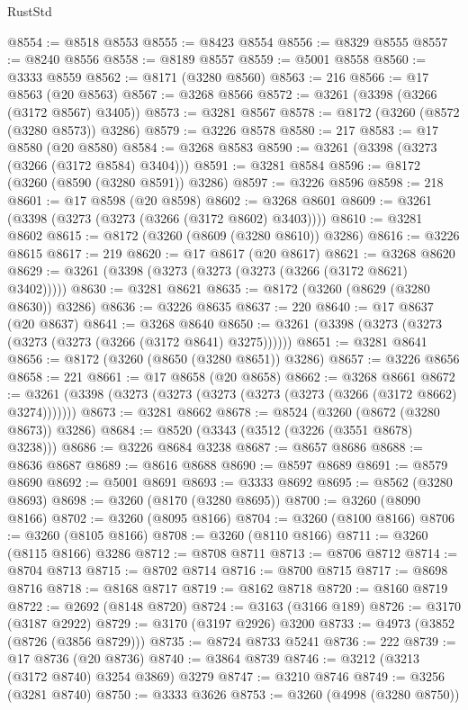 \begin{lexlean}{RustStd}
\begin{coremodule}
@8554 := @8518 @8553
@8555 := @8423 @8554
@8556 := @8329 @8555
@8557 := @8240 @8556
@8558 := @8189 @8557
@8559 := @5001 @8558
@8560 := @3333 @8559
@8562 := @8171 (@3280 @8560)
@8563 := 216
@8566 := @17 @8563 (@20 @8563)
@8567 := @3268 @8566
@8572 := @3261 (@3398 (@3266 (@3172 @8567) @3405))
@8573 := @3281 @8567
@8578 := @8172 (@3260 (@8572 (@3280 @8573)) @3286)
@8579 := @3226 @8578
@8580 := 217
@8583 := @17 @8580 (@20 @8580)
@8584 := @3268 @8583
@8590 := @3261 (@3398 (@3273 (@3266 (@3172 @8584) @3404)))
@8591 := @3281 @8584
@8596 := @8172 (@3260 (@8590 (@3280 @8591)) @3286)
@8597 := @3226 @8596
@8598 := 218
@8601 := @17 @8598 (@20 @8598)
@8602 := @3268 @8601
@8609 := @3261 (@3398 (@3273 (@3273 (@3266 (@3172 @8602) @3403))))
@8610 := @3281 @8602
@8615 := @8172 (@3260 (@8609 (@3280 @8610)) @3286)
@8616 := @3226 @8615
@8617 := 219
@8620 := @17 @8617 (@20 @8617)
@8621 := @3268 @8620
@8629 := @3261 (@3398 (@3273 (@3273 (@3273 (@3266 (@3172 @8621) @3402)))))
@8630 := @3281 @8621
@8635 := @8172 (@3260 (@8629 (@3280 @8630)) @3286)
@8636 := @3226 @8635
@8637 := 220
@8640 := @17 @8637 (@20 @8637)
@8641 := @3268 @8640
@8650 := @3261 (@3398 (@3273 (@3273 (@3273 (@3273 (@3266 (@3172 @8641) @3275))))))
@8651 := @3281 @8641
@8656 := @8172 (@3260 (@8650 (@3280 @8651)) @3286)
@8657 := @3226 @8656
@8658 := 221
@8661 := @17 @8658 (@20 @8658)
@8662 := @3268 @8661
@8672 := @3261 (@3398 (@3273 (@3273 (@3273 (@3273 (@3273 (@3266 (@3172 @8662) @3274)))))))
@8673 := @3281 @8662
@8678 := @8524 (@3260 (@8672 (@3280 @8673)) @3286)
@8684 := @8520 (@3343 (@3512 (@3226 (@3551 @8678) @3238)))
@8686 := @3226 @8684 @3238
@8687 := @8657 @8686
@8688 := @8636 @8687
@8689 := @8616 @8688
@8690 := @8597 @8689
@8691 := @8579 @8690
@8692 := @5001 @8691
@8693 := @3333 @8692
@8695 := @8562 (@3280 @8693)
@8698 := @3260 (@8170 (@3280 @8695))
@8700 := @3260 (@8090 @8166)
@8702 := @3260 (@8095 @8166)
@8704 := @3260 (@8100 @8166)
@8706 := @3260 (@8105 @8166)
@8708 := @3260 (@8110 @8166)
@8711 := @3260 (@8115 @8166) @3286
@8712 := @8708 @8711
@8713 := @8706 @8712
@8714 := @8704 @8713
@8715 := @8702 @8714
@8716 := @8700 @8715
@8717 := @8698 @8716
@8718 := @8168 @8717
@8719 := @8162 @8718
@8720 := @8160 @8719
@8722 := @2692 (@8148 @8720)
@8724 := @3163 (@3166 @189)
@8726 := @3170 (@3187 @2922)
@8729 := @3170 (@3197 @2926) @3200
@8733 := @4973 (@3852 (@8726 (@3856 @8729)))
@8735 := @8724 @8733 @5241
@8736 := 222
@8739 := @17 @8736 (@20 @8736)
@8740 := @3864 @8739
@8746 := @3212 (@3213 (@3172 @8740) @3254 @3869) @3279
@8747 := @3210 @8746
@8749 := @3256 (@3281 @8740)
@8750 := @3333 @3626
@8753 := @3260 (@4998 (@3280 @8750))

\end{coremodule}
\end{lexlean}
